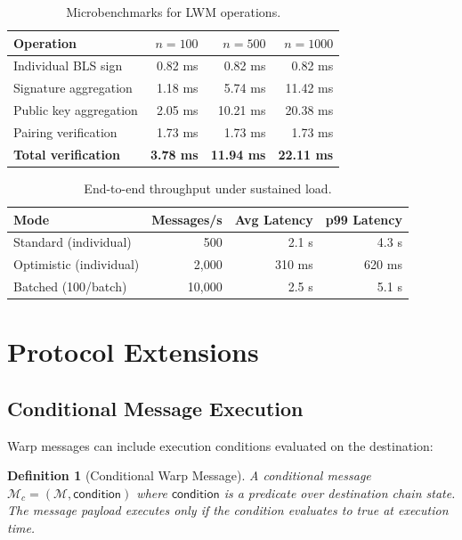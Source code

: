 \documentclass[11pt,a4paper]{article}
\newtheorem{definition}{Definition}
\begin{document}
\begin{table}[H]
\centering
\caption{Microbenchmarks for LWM operations.}
\label{tab:benchmarks}
\begin{tabular}{lrrr}
\toprule
\textbf{Operation} & \textbf{$n=100$} & \textbf{$n=500$} & \textbf{$n=1000$} \\
\midrule
Individual BLS sign & 0.82 ms & 0.82 ms & 0.82 ms \\
Signature aggregation & 1.18 ms & 5.74 ms & 11.42 ms \\
Public key aggregation & 2.05 ms & 10.21 ms & 20.38 ms \\
Pairing verification & 1.73 ms & 1.73 ms & 1.73 ms \\
\textbf{Total verification} & \textbf{3.78 ms} & \textbf{11.94 ms} & \textbf{22.11 ms} \\
\bottomrule
\end{tabular}
\end{table}

\begin{table}[H]
\centering
\caption{End-to-end throughput under sustained load.}
\label{tab:throughput}
\begin{tabular}{lrrr}
\toprule
\textbf{Mode} & \textbf{Messages/s} & \textbf{Avg Latency} & \textbf{p99 Latency} \\
\midrule
Standard (individual) & 500 & 2.1 s & 4.3 s \\
Optimistic (individual) & 2{,}000 & 310 ms & 620 ms \\
Batched (100/batch) & 10{,}000 & 2.5 s & 5.1 s \\
\bottomrule
\end{tabular}
\end{table}

\section{Protocol Extensions}\label{sec:extensions}

\subsection{Conditional Message Execution}

Warp messages can include execution conditions evaluated on the destination:

\begin{definition}[Conditional Warp Message]
A conditional message $\mathcal{M}_c = (\mathcal{M}, \mathsf{condition})$ where $\mathsf{condition}$ is a predicate over destination chain state. The message payload executes only if the condition evaluates to true at execution time.
\end{definition}
\end{document}
